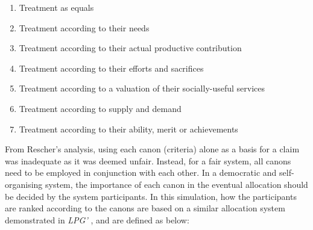 \begin{enumerate} %
	\item Treatment as equals
	\item Treatment according to their needs
	\item Treatment according to their actual productive contribution
	\item Treatment according to their efforts and sacrifices
	\item Treatment according to a valuation of their socially-useful services
	\item Treatment according to supply and demand
	\item Treatment according to their ability, merit or achievements
\end{enumerate}


From Rescher's analysis, using each canon (criteria) alone as a basis for a claim was inadequate as it was deemed unfair. Instead, for a fair system, all canons need to be employed in conjunction with each other. In a democratic and self-organising system, the importance of each canon in the eventual allocation should be decided by the system participants. In this simulation, how the participants are ranked according to the canons are based on a similar allocation system demonstrated in \textit{LPG'}\cite{PittSASO2012} , and are defined as below:

